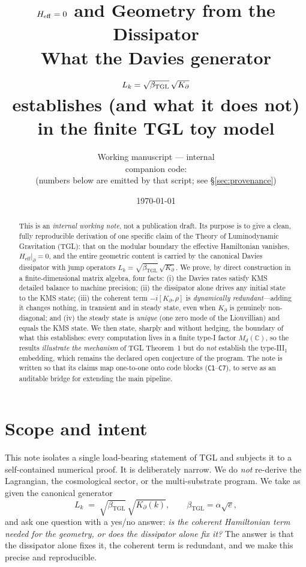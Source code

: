 \documentclass[11pt,a4paper]{article}
\title{\textbf{$\Heff = 0$ and Geometry from the Dissipator}\\[4pt]
\large What the Davies generator $L_k=\sqrt{\beTGL}\,\sqrt{\Kp}$\\
establishes (and what it does not) in the finite TGL toy model}
\author{Working manuscript --- internal\\
\small companion code: \code{davies\_geometry\_derivation.py}\\
\small (numbers below are emitted by that script; see \S\ref{sec:provenance})}
\date{\today}
\theoremstyle{plain}
\theoremstyle{definition}
\newcommand{\Kp}{K_{\partial}}
\newcommand{\beTGL}{\beta_{\mathrm{TGL}}}
\newcommand{\Heff}{H_{\mathrm{eff}}}
\newcommand{\code}[1]{\texttt{#1}}
\begin{document}
\maketitle

\begin{abstract}
\noindent
This is an \emph{internal working note}, not a publication draft. Its purpose
is to give a clean, fully reproducible derivation of one specific claim of the
Theory of Luminodynamic Gravitation (TGL): that on the modular boundary the
effective Hamiltonian vanishes, $\Heff|_\partial = 0$, and the entire geometric
content is carried by the canonical Davies dissipator with jump operators
$L_k = \sqrt{\beTGL}\,\sqrt{\Kp}$. We prove, by direct construction in a
finite-dimensional matrix algebra, four facts: (i) the Davies rates satisfy KMS
detailed balance to machine precision; (ii) the dissipator alone drives any
initial state to the KMS state; (iii) the coherent term $-i[\Kp,\rho]$ is
\emph{dynamically redundant}---adding it changes nothing, in transient and in
steady state, even when $\Kp$ is genuinely non-diagonal; and (iv) the steady
state is \emph{unique} (one zero mode of the Liouvillian) and equals the KMS
state. We then state, sharply and without hedging, the boundary of what this
establishes: every computation lives in a finite type-I factor $M_d(\mathbb{C})$,
so the results \emph{illustrate the mechanism} of TGL Theorem~1 but do
\emph{not} establish the type-III$_1$ embedding, which remains the declared open
conjecture of the program. The note is written so that its claims map one-to-one
onto code blocks (\code{C1}--\code{C7}), to serve as an auditable bridge for
extending the main pipeline.
\end{abstract}

\tableofcontents

\section{Scope and intent}\label{sec:scope}

This note isolates a single load-bearing statement of TGL and subjects it to a
self-contained numerical proof. It is deliberately narrow. We do \emph{not}
re-derive the Lagrangian, the cosmological sector, or the multi-substrate
program. We take as given the canonical generator
\begin{equation}
  L_k \;=\; \sqrt{\beTGL}\,\sqrt{\Kp(k)},
  \qquad
  \beTGL = \alpha\sqrt{e},
  \label{eq:Lcompact}
\end{equation}
and ask one question with a yes/no answer: \emph{is the coherent Hamiltonian
term needed for the geometry, or does the dissipator alone fix it?} The answer
is that the dissipator alone fixes it, the coherent term is redundant, and we
make this precise and reproducible.
\end{document}
